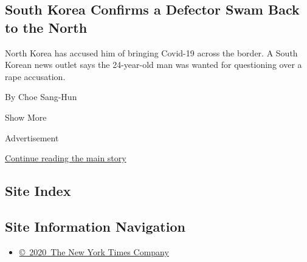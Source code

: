 \begin{enumerate}
  \hypertarget{south-korea-confirms-a-defector-swam-back-to-the-north}{%
  \subsection{South Korea Confirms a Defector Swam Back to the
  North}\label{south-korea-confirms-a-defector-swam-back-to-the-north}}

  North Korea has accused him of bringing Covid-19 across the border. A
  South Korean news outlet says the 24-year-old man was wanted for
  questioning over a rape accusation.

  By Choe Sang-Hun
\end{enumerate}

Show More

Advertisement

\protect\hyperlink{after-mid2}{Continue reading the main story}

\hypertarget{site-index}{%
\subsection{Site Index}\label{site-index}}

\hypertarget{site-information-navigation}{%
\subsection{Site Information
Navigation}\label{site-information-navigation}}

\begin{itemize}
\tightlist
\item
  \href{https://help.nytimes3xbfgragh.onion/hc/en-us/articles/115014792127-Copyright-notice}{©~2020~The
  New York Times Company}
\end{itemize}

